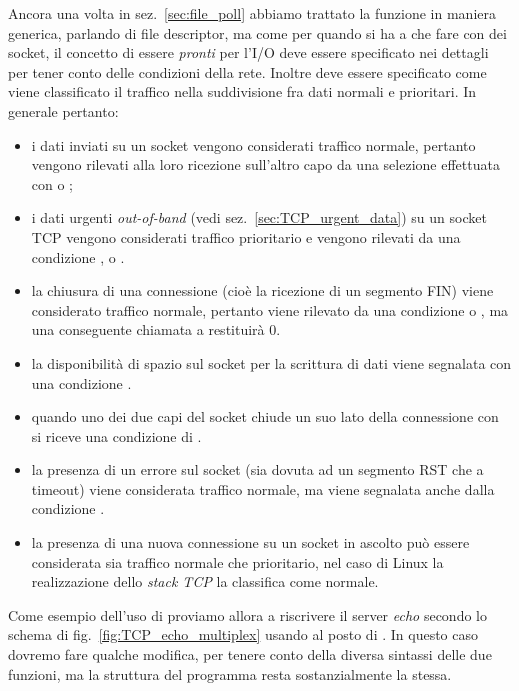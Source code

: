 Ancora una volta in sez.~\ref{sec:file_poll} abbiamo trattato la funzione in
maniera generica, parlando di file descriptor, ma come per 
quando si ha a che fare con dei socket, il concetto di essere \textsl{pronti}
per l'I/O deve essere specificato nei dettagli per tener conto delle
condizioni della rete. Inoltre deve essere specificato come viene classificato
il traffico nella suddivisione fra dati normali e prioritari. In generale
pertanto:
\begin{itemize}
\item i dati inviati su un socket vengono considerati traffico normale,
  pertanto vengono rilevati alla loro ricezione sull'altro capo da una
  selezione effettuata con  o ;
\item i dati urgenti \textit{out-of-band} (vedi
  sez.~\ref{sec:TCP_urgent_data}) su un socket TCP vengono considerati
  traffico prioritario e vengono rilevati da una condizione ,
   o .
\item la chiusura di una connessione (cioè la ricezione di un segmento FIN)
  viene considerato traffico normale, pertanto viene rilevato da una
  condizione  o , ma una conseguente chiamata
  a  restituirà 0.
\item la disponibilità di spazio sul socket per la scrittura di dati viene
  segnalata con una condizione .
\item quando uno dei due capi del socket chiude un suo lato della connessione
  con  si riceve una condizione di .
\item la presenza di un errore sul socket (sia dovuta ad un segmento RST che a
  timeout) viene considerata traffico normale, ma viene segnalata anche dalla
  condizione .
\item la presenza di una nuova connessione su un socket in ascolto può essere
  considerata sia traffico normale che prioritario, nel caso di Linux la
  realizzazione dello \textit{stack TCP} la classifica come normale.
\end{itemize}

Come esempio dell'uso di  proviamo allora a riscrivere il server
\textit{echo} secondo lo schema di fig.~\ref{fig:TCP_echo_multiplex} usando
 al posto di . In questo caso dovremo fare qualche
modifica, per tenere conto della diversa sintassi delle due funzioni, ma la
struttura del programma resta sostanzialmente la stessa.


